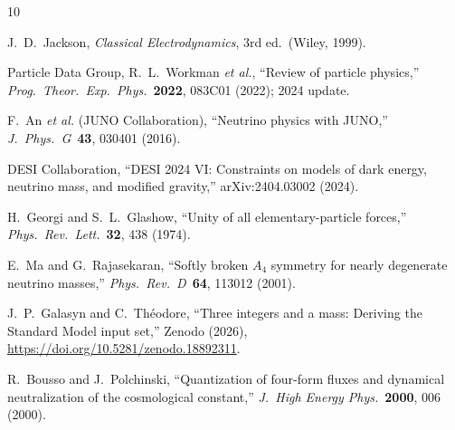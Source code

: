 \documentclass[11pt,a4paper]{article}
\begin{document}
\begin{thebibliography}{10}

J.~D.~Jackson,
\emph{Classical Electrodynamics}, 3rd ed.\ (Wiley, 1999).

Particle Data Group, R.~L.~Workman \emph{et al.},
``Review of particle physics,''
\emph{Prog.\ Theor.\ Exp.\ Phys.}\ \textbf{2022}, 083C01 (2022); 2024 update.

F.~An \emph{et al.} (JUNO Collaboration),
``Neutrino physics with JUNO,''
\emph{J.\ Phys.\ G}\ \textbf{43}, 030401 (2016).

DESI Collaboration,
``DESI 2024 VI: Constraints on models of dark energy, neutrino mass, and modified gravity,''
arXiv:2404.03002 (2024).

H.~Georgi and S.~L.~Glashow,
``Unity of all elementary-particle forces,''
\emph{Phys.\ Rev.\ Lett.}\ \textbf{32}, 438 (1974).

E.~Ma and G.~Rajasekaran,
``Softly broken $A_4$ symmetry for nearly degenerate neutrino masses,''
\emph{Phys.\ Rev.\ D}\ \textbf{64}, 113012 (2001).

J.~P.~Galasyn and C.~Th\'eodore,
``Three integers and a mass: Deriving the Standard Model input set,''
Zenodo (2026), \url{https://doi.org/10.5281/zenodo.18892311}.

R.~Bousso and J.~Polchinski,
``Quantization of four-form fluxes and dynamical neutralization of the cosmological constant,''
\emph{J.\ High Energy Phys.}\ \textbf{2000}, 006 (2000).

\end{thebibliography}
\end{document}
